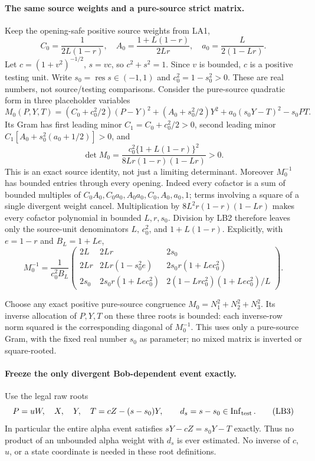 \paragraph{The same source weights and a pure-source strict matrix.}
Keep the opening-safe positive source weights from LA1,
\[
 C_0=\frac1{2L(1-r)},\quad
 A_0=\frac{1+L(1-r)}{2Lr},\quad
 a_0=\frac L{2(1-Lr)}.
\]
Let $c=(1+v^2)^{-1/2}$, $s=vc$, so $c^2+s^2=1$.
Since $v$ is bounded, $c$ is a positive testing unit.  Write
$s_0=\operatorname{res}s\in(-1,1)$ and $c_0^2=1-s_0^2>0$.
These are real numbers, not source/testing comparisons.  Consider
the pure-source quadratic form in three placeholder variables
\[
 M_0(P,Y,T)=
  (C_0+c_0^2/2)(P-Y)^2+(A_0+s_0^2/2)Y^2
          +a_0(s_0Y-T)^2-s_0PT.                    \tag{LB1}
\]
Its Gram has first leading minor $C_1=C_0+c_0^2/2>0$,
second leading minor $C_1[A_0+s_0^2(a_0+1/2)]>0$, and
\[
 \det M_0=
 \frac{c_0^2\{1+L(1-r)\}^2}
                {8Lr(1-r)(1-Lr)}>0.               \tag{LB2}
\]
This is an exact source identity, not just a limiting determinant.
Moreover $M_0^{-1}$ has bounded entries through every opening.
Indeed every cofactor is a sum of bounded multiples of
$C_0A_0,C_0a_0,A_0a_0,C_0,A_0,a_0,1$; terms involving a square
of a single divergent weight cancel.  Multiplication by
$8L^2r(1-r)(1-Lr)$ makes every cofactor polynomial in bounded
$L,r,s_0$.  Division by LB2 therefore leaves only the source-unit
denominators $L$, $c_0^2$, and $1+L(1-r)$.
Explicitly, with $e=1-r$ and $B_L=1+Le$,
\[
 M_0^{-1}=\frac1{c_0^2B_L}
 \begin{pmatrix}
 2L&2Lr&2s_0\\
 2Lr&2Lr(1-s_0^2e)&2s_0r(1+Le c_0^2)\\
 2s_0&2s_0r(1+Le c_0^2)&
       2(1-Lr c_0^2)(1+Le c_0^2)/L
 \end{pmatrix}.                                      \tag{LB2a}
\]

Choose any exact positive pure-source congruence
$M_0=N_1^2+N_2^2+N_3^2$.  Its inverse allocation of $P,Y,T$
on these three roots is bounded: each inverse-row norm squared is
the corresponding diagonal of $M_0^{-1}$.  This uses only a
pure-source Gram, with the fixed real number $s_0$ as parameter;
no mixed matrix is inverted or square-rooted.

\paragraph{Freeze the only divergent Bob-dependent event exactly.}
Use the legal raw roots
\[
 P=uW,\quad X,\quad Y,\quad
 T=cZ-(s-s_0)Y,
 \qquad d_s=s-s_0\in\operatorname{Inf}_{\rm test}.
                                                               \tag{LB3}
\]
In particular the entire alpha event satisfies
$sY-cZ=s_0Y-T$ exactly.  Thus no product of an unbounded alpha
weight with $d_s$ is ever estimated.  No inverse of $c$, $u$, or
a state coordinate is needed in these root definitions.

